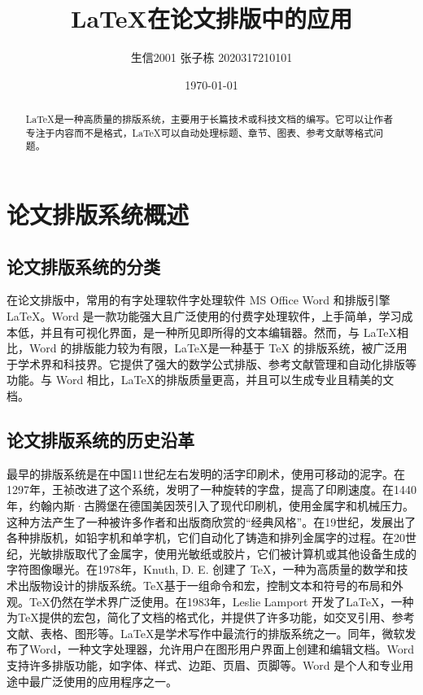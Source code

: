 \documentclass[UTF8]{ctexart}
\title{\LaTeX 在论文排版中的应用}
\author{生信2001 张子栋 2020317210101}
\date{\today}
\begin{document}
\maketitle
\thispagestyle{empty}
\clearpage

\tableofcontents
\setcounter{page}{1}
\clearpage

\thispagestyle{empty}
\begin{abstract}
    \LaTeX 是一种高质量的排版系统，主要用于长篇技术或科技文档的编写。它可以让作者专注于内容而不是格式，\LaTeX 可以自动处理标题、章节、图表、参考文献等格式问题。
\end{abstract}
\clearpage

\pagestyle{fancy}
\setcounter{page}{1}

\section{论文排版系统概述}
\subsection{论文排版系统的分类}
在论文排版中，常用的有字处理软件字处理软件 MS Office Word \cite{word}和排版引擎 \LaTeX。Word 是一款功能强大且广泛使用的付费字处理软件，上手简单，学习成本低，并且有可视化界面，是一种所见即所得的文本编辑器。然而，与 \LaTeX 相比，Word 的排版能力较为有限，\LaTeX 是一种基于 \TeX \cite{tex} 的排版系统，被广泛用于学术界和科技界。它提供了强大的数学公式排版、参考文献管理和自动化排版等功能。与 Word 相比，\LaTeX 的排版质量更高，并且可以生成专业且精美的文档。

\subsection{论文排版系统的历史沿革}

最早的排版系统是在中国11世纪左右发明的活字印刷术，使用可移动的泥字。在1297年，王祯改进了这个系统，发明了一种旋转的字盘，提高了印刷速度。在1440年，约翰内斯·古腾堡在德国美因茨引入了现代印刷机，使用金属字和机械压力。这种方法产生了一种被许多作者和出版商欣赏的“经典风格”。在19世纪，发展出了各种排版机，如铅字机和单字机，它们自动化了铸造和排列金属字的过程。在20世纪，光敏排版取代了金属字，使用光敏纸或胶片，它们被计算机或其他设备生成的字符图像曝光。在1978年，Knuth, D. E. 创建了 \TeX，一种为高质量的数学和技术出版物设计的排版系统。\TeX 基于一组命令和宏，控制文本和符号的布局和外观。\TeX 仍然在学术界广泛使用。在1983年，Leslie Lamport 开发了\LaTeX，一种为\TeX 提供的宏包，简化了文档的格式化，并提供了许多功能，如交叉引用、参考文献、表格、图形等。\LaTeX 是学术写作中最流行的排版系统之一。同年，微软发布了Word，一种文字处理器，允许用户在图形用户界面上创建和编辑文档。Word支持许多排版功能，如字体、样式、边距、页眉、页脚等。Word 是个人和专业用途中最广泛使用的应用程序之一。
\end{document}

